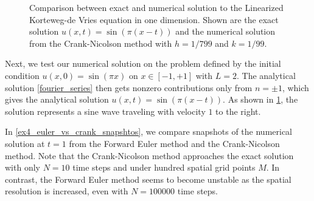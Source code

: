 \begin{figure}[b]
\centering
{}
\caption{\label{sine_evolution}
  Comparison between exact and numerical solution to the Linearized Korteweg-de Vries equation in one dimension.
  Shown are the exact solution $u(x,t)=\sin(\pi(x-t))$ and the numerical solution from the Crank-Nicolson method with $h=1/799$ and $k=1/99$.
}
\end{figure}

Next, we test our numerical solution on the problem defined by the initial condition $u(x, 0) = \sin(\pi x)$ on $x \in [-1, +1]$ with $L = 2$.
The analytical solution \ref{fourier_series} then gets nonzero contributions only from $n = \pm 1$, which gives the analytical solution $u(x, t) = \sin(\pi(x-t))$.
As shown in \cref{sine_evolution}, the solution represents a sine wave traveling with velocity $1$ to the right.

In \cref{ex4_euler_vs_crank_snapshtos}, we compare snapshots of the numerical solution at $t = 1$ from the Forward Euler method and the Crank-Nicolson method.
Note that the Crank-Nicolson method approaches the exact solution with only $N=10$ time steps and under hundred spatial grid points $M$.
In contrast, the Forward Euler method seems to become unstable as the spatial resolution is increased, even with $N=100000$ time steps.

